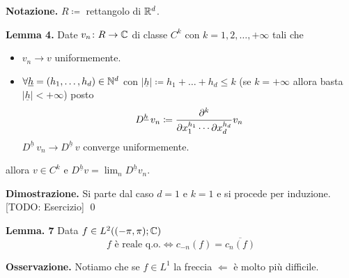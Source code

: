 \textbf{Notazione.} $R \coloneqq $ rettangolo di $\mathbb R^d$.

\textbf{Lemma 4.}
Date $v_n \colon R \to \mathbb C$ di classe $C^k$ con $k = 1, 2, \dots, +\infty$ tali che
\begin{itemize}
	\item $v_n \to v$ uniformemente.

	\item $\forall \underline h = (h_1, \dots, h_d) \in \mathbb N^d$ con $|\underline h| \coloneqq h_1 + \dots + h_d \leq k$ (se $k = +\infty$ allora basta $|\underline h| < +\infty$) posto
		$$
		D^{\underline h} \, v_n \coloneqq
		\frac{\partial^k}{\partial x_1^{h_1} \cdots \partial x_d^{h_d}} v_n
		$$
		$D^{\underline h} \, v_n \to D^{\underline h} \, v$ converge uniformemente.
\end{itemize}
allora $v \in C^k$ e $D^{\underline h} v = \lim_{n} D^{\underline h} v_n$.

\textbf{Dimostrazione.}
Si parte dal caso $d = 1$ e $k = 1$ e si procede per induzione. [TODO: Esercizio]
\qed




\textbf{Lemma. 7}
Data $f \in L^2((-\pi, \pi); \mathbb C)$
$$
	f \text{ è reale q.o.} \iff c_{-n}(f) = \overline{c_n(f)}
$$

\textbf{Osservazione.}
Notiamo che se $f \in L^1$ la freccia $\boxed{\Leftarrow}$ è molto più difficile.

